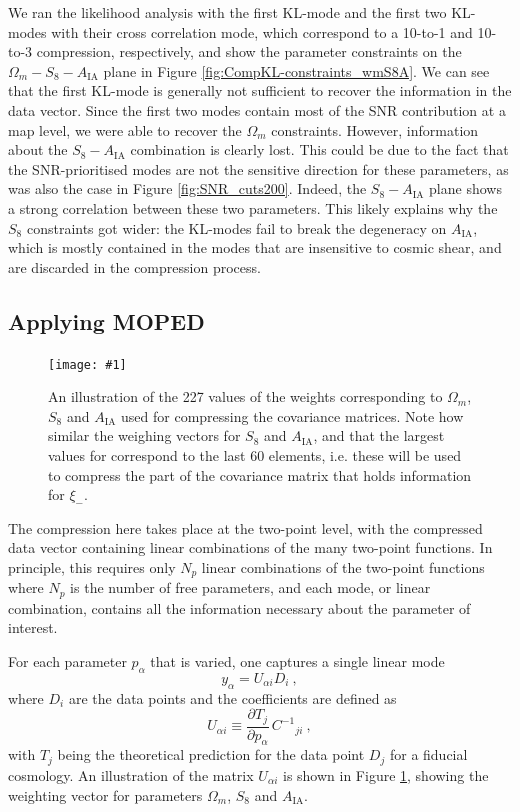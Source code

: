 \documentclass[twocolumn]{\docclass}
\newcommand{\sfig}[2]{
	\texttt{[image: \#1]}
}
\newcommand{\Svwide}[2]{
	\begin{figure}[thbp]
		\sfig{../figures/#1.pdf}{\textwidth}
		\caption{{\small #2}}
		\label{fig:#1}
	\end{figure}
}
\newcommand{\rf}[1]{Figure \ref{fig:#1}}
\newcommand\be{\begin{equation}}
\newcommand\ee{\end{equation}}
\begin{document}
	We ran the likelihood analysis with the first KL-mode and the first two KL-modes with their cross correlation mode, which correspond to a 10-to-1 and 10-to-3 compression, respectively, and show the parameter constraints on the $\Omega_m - S_8 - A_{\mathrm{IA}}$ plane in \rf{CompKL-constraints_wmS8A}. We can see that the first KL-mode is generally not sufficient to recover the information in the data vector. Since the first two modes contain most of the SNR contribution at a map level, we were able to recover the $\Omega_m$ constraints. However, information about the $S_8-A_{\mathrm{IA}}$ combination is clearly lost. This could be due to the fact that the SNR-prioritised modes are not the sensitive direction for these parameters, as was also the case in \rf{SNR_cuts200}. Indeed, the $S_8 - A_{\mathrm{IA}}$ plane shows a strong correlation between these two parameters. This likely explains why the $S_8$ constraints got wider: the KL-modes fail to break the degeneracy on $A_{\mathrm{IA}}$, which is mostly contained in the modes that are insensitive to cosmic shear, and are discarded in the compression process.
	
	\subsection{Applying MOPED}
	\label{subsec:2pt_compression}
	
	\Svwide{Weights_2pt}{An illustration of the 227 values of the weights corresponding to $\Omega_m$, $S_8$ and $A_{\mathrm{IA}}$ used for compressing the covariance matrices. Note how similar the weighing vectors for $S_8$ and $A_{\mathrm{IA}}$, and that the largest values for correspond to the last 60 elements, i.e. these will be used to compress the part of the covariance matrix that holds information for $\xi_-$.}
	
	The compression here takes place at the two-point level, with the compressed data vector containing linear combinations of the many two-point functions. In principle, this requires only $N_p$ linear combinations of the two-point functions where $N_p$ is the number of free parameters, and each mode, or linear combination, contains all the information necessary about the parameter of interest. 
	
	For each parameter $p_\alpha$ that is varied, one captures a single linear mode
	\be
	y_\alpha = U_{\alpha i} D_i\
	,\ee
	where $D_i$ are the data points and the coefficients are defined as
	\be \label{eq:compression_scheme}
	U_{\alpha i} \equiv \frac{\partial T_j}{\partial p_\alpha} \, C^{-1}{}_{ji}\
	,\ee
	with $T_j$ being the theoretical prediction for the data point $D_j$ for a fiducial cosmology. An illustration of the matrix $U_{\alpha i}$ is shown in \rf{Weights_2pt}, showing the weighting vector for parameters $\Omega_m$, $S_8$ and $A_{\mathrm{IA}}$.
	
\end{document}
